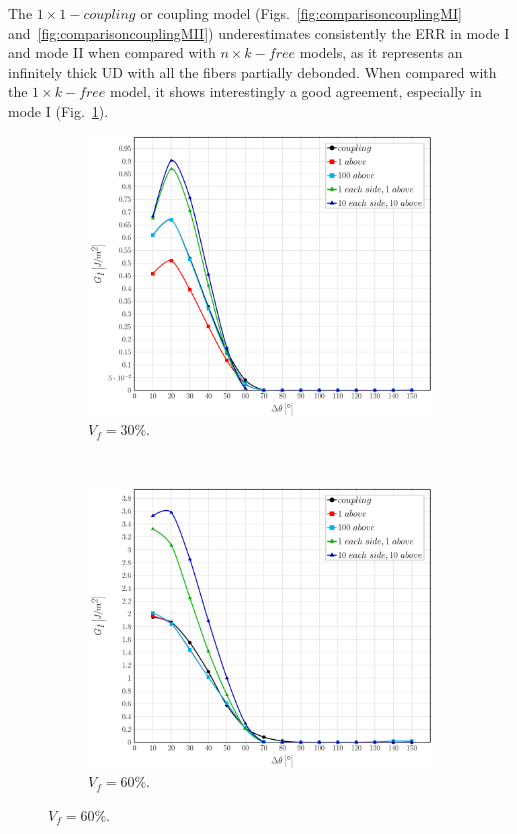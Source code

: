\documentclass[review]{elsarticle}
\begin{document}
The $1\times 1-coupling$ or coupling model (Figs.~\ref{fig:comparisoncouplingMI} and~\ref{fig:comparisoncouplingMII}) underestimates consistently the ERR in mode I and mode II when compared with $n\times k-free$ models, as it represents an infinitely thick UD with all the fibers partially debonded. When compared with the $1\times k-free$ model, it shows interestingly a good agreement, especially in mode I (Fig.~\ref{subfig:comparisoncoupling30MI}).

\begin{figure}[!h]
\centering
    \begin{subfigure}[b]{0.475\textwidth}
        \includegraphics[width=\textwidth]{comparecouplingabovesidefibers-vf30-GI.pdf}
        \caption{$V_{f}=30\%$.}\label{subfig:comparisoncoupling30MI}
    \end{subfigure} ~
    \begin{subfigure}[b]{0.475\textwidth}
        \includegraphics[width=\textwidth]{comparecouplingabovesidefibers-vf60-GI.pdf}
        \caption{$V_{f}=60\%$.}\label{subfig:comparisoncoupling60MI}
    \end{subfigure}


\end{figure}
\end{document}
